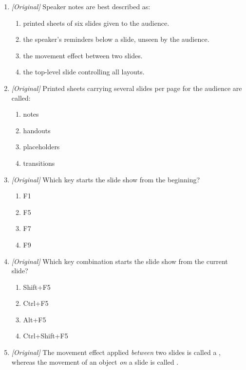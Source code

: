 \begin{enumerate}[label=\textbf{Q\arabic*.}, leftmargin=*]
\begin{enumerate}[label=\Alph*.]
    \item Slide Sorter view
    \item Outline View
  \end{enumerate}
\item \textit{[Original]} Speaker notes are best described as:
  \begin{enumerate}[label=\Alph*.]
    \item printed sheets of six slides given to the audience.
    \item the speaker's reminders below a slide, unseen by the audience.
    \item the movement effect between two slides.
    \item the top-level slide controlling all layouts.
  \end{enumerate}
\item \textit{[Original]} Printed sheets carrying several slides per page for
  the audience are called:
  \begin{enumerate}[label=\Alph*.]
    \item notes
    \item handouts
    \item placeholders
    \item transitions
  \end{enumerate}
\item \textit{[Original]} Which key starts the slide show from the beginning?
  \begin{enumerate}[label=\Alph*.]
    \item F1
    \item F5
    \item F7
    \item F9
  \end{enumerate}
\item \textit{[Original]} Which key combination starts the slide show from
  the current slide?
  \begin{enumerate}[label=\Alph*.]
    \item Shift+F5
    \item Ctrl+F5
    \item Alt+F5
    \item Ctrl+Shift+F5
  \end{enumerate}
\item \textit{[Original]} The movement effect applied \textit{between} two
  slides is called a \underline{\hspace{2.2cm}}, whereas the movement of an
  object \textit{on} a slide is called \underline{\hspace{2.2cm}}.

\end{enumerate}
